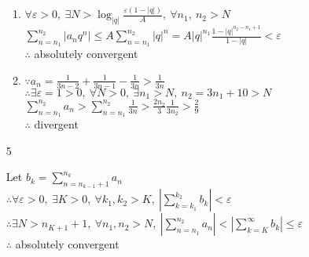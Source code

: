 \begin{enumerate}[1]
\begin{enumerate}[(1)]
	\item 
	\(\forall \varepsilon>0,\  \exists N>\log _{|q|} \frac{\varepsilon(1-|q|)}{A},\  \forall n_{1},\  n_{2}>N\)\\
 	\(\sum\limits_{n=n_{1}}^{n_{2}}\left|a_{n} q^{n}\right| \leqslant A \sum\limits_{n=n_{1}}^{n_{2}}|q|^{n}=A|q|^{n_{1}} \frac{1-|q|^{n_{2}-n_{1}+1}}{1-|q|}<\varepsilon\)\\
	\(\therefore\) absolutely convergent

	\item 
	\(\because a_n=\frac{1}{3 n-2}+\frac{1}{3 n-1}-\frac{1}{3 n}>\frac{1}{3 n}\)\\
	\(\therefore \exists \varepsilon=1>0,\  \forall N>0,\  \exists n_{1} >N,\ n_2=3n_1+10>N	\)\\
	\(\sum\limits_{n=n_{1}}^{n_{2}} a_{n}>\sum\limits_{n=n_1}^{n_2} \frac{1}{3 n}>\frac{2n_2}{3}\frac{1}{3n_2}>\frac{2}{9}\)\\
	\(\therefore\) divergent


\end{enumerate}
	\item[5]   	
	
	Let \(b_{k}=\sum\limits_{n=n_{k-1}+1}^{n_{k}} a_{n}\)\\
	\(\therefore \forall \varepsilon>0,\ \exists K>0,\ \forall k_{1},k_{2}>K,\ \left|\sum\limits_{k=k_{1}}^{k_{2}} b_{k}\right|<\varepsilon\)\\
	\(\therefore \exists N>n_{K+1}+1,\  \forall n_{1}, n_{2}>N,\ \left|\sum\limits_{n=n_{1}}^{n_{2}} a_{n}\right|<\left|\sum\limits_{k=K}^{\infty} b_{k}\right| \leqslant \varepsilon\)\\
	\(\therefore\) absolutely convergent
	
\end{enumerate}